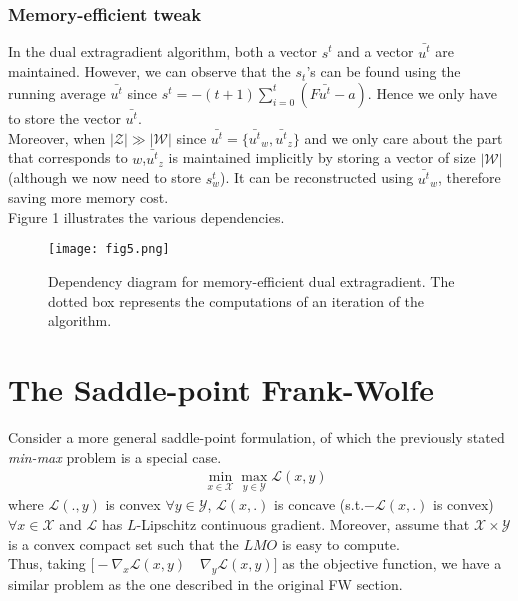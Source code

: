 \documentclass{article}
\begin{document}
\subsubsection{Memory-efficient tweak}
In the dual extragradient algorithm, both a vector $s^t$ and a vector
$\bar{u^t}$ are maintained. However, we can observe that the $s_t$'s can be
found using the running average $\bar{u^t}$ since $s^t = -(t + 1 ) \sum_{i=0}^t
(F \bar{u^t} - a)$. Hence we only have to store the vector $\bar{u^t}$.\\
Moreover, when $|\mathcal{Z}| \gg |\mathcal{W}|$ since $\bar{u^t} = \{
\bar{u^t}_w,\bar{u^t}_z \}$ and we only care about the part that corresponds to
$w$,\quad$\bar{u^t}_z$ is maintained implicitly by storing a vector of size
$|\mathcal{W}|$ (although we now need to store $s_w^t$). It can be reconstructed
using $\bar{u^t}_w$, therefore saving more memory cost.\\
Figure 1 illustrates the various dependencies.

\begin{figure}
  \texttt{[image: fig5.png]}
  \caption{Dependency diagram for memory-efficient dual extragradient. The dotted box represents the computations of an iteration of the algorithm.}
  \label{fig:Dependency diagram}
\end{figure}

\section{The Saddle-point Frank-Wolfe}
Consider a more general saddle-point formulation, of which the previously stated \textit{min-max} problem is a special case.
\begin{equation*}
\begin{aligned}
    &\min_{x\in\mathcal{X}}\max_{y\in\mathcal{Y}}\mathcal{L}(x,y)
\end{aligned}
\end{equation*}
where $\mathcal{L}(.,y)$ is convex $\forall y\in\mathcal{Y}$, $\mathcal{L}(x,.)$ is concave (s.t.$- \mathcal{L}(x,.)$ is convex) $\forall x\in\mathcal{X}$  and $\mathcal{L}$ has $L$-Lipschitz continuous gradient. Moreover, assume that $\mathcal{X}\times\mathcal{Y}$ is a convex compact set  such that the $LMO$ is easy to compute.\\
Thus, taking $\Big[-\nabla_{x} \mathcal{L}(x,y)\quad \nabla_{y} \mathcal{L}(x,y)\Big]$ as the objective function, we have a similar problem as the one described in the original FW section.
\end{document}
